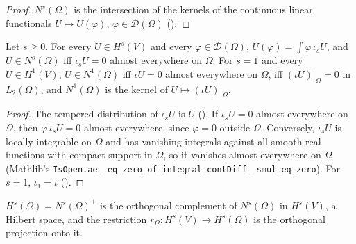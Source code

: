 \begin{proof}
\leanok
$N^s(\Omega)$ is the intersection of the kernels of the continuous linear functionals
$U \mapsto U(\varphi)$, $\varphi \in \mathcal D(\Omega)$ ().
\end{proof}

\begin{proposition}
\label{prop:sobolev-vanishing-one}
\leanok
{}
Let $s \geq 0$. For every $U \in H^s(V)$ and every $\varphi \in \mathcal D(\Omega)$,
$U(\varphi) = \int \varphi \, \iota_s U$, and $U \in N^s(\Omega)$ iff $\iota_s U = 0$ almost
everywhere on $\Omega$. For $s = 1$ and every $U \in H^1(V)$, $U \in N^1(\Omega)$ iff
$\iota U = 0$ almost everywhere on $\Omega$, iff $(\iota U)|_\Omega = 0$ in $L_2(\Omega)$, and
$N^1(\Omega)$ is the kernel of $U \mapsto (\iota U)|_\Omega$.
\end{proposition}

\begin{proof}
\leanok
The tempered distribution of $\iota_s U$ is $U$ (). If $\iota_s U = 0$
almost everywhere on $\Omega$, then $\varphi \, \iota_s U = 0$ almost everywhere, since
$\varphi = 0$ outside $\Omega$. Conversely, $\iota_s U$ is locally integrable on $\Omega$ and has
vanishing integrals against all smooth real functions with compact support in $\Omega$, so it
vanishes almost everywhere on $\Omega$ (Mathlib's \texttt{IsOpen.\allowbreak ae\_\allowbreak
eq\_\allowbreak zero\_\allowbreak of\_\allowbreak integral\_\allowbreak contDiff\_\allowbreak
smul\_\allowbreak eq\_\allowbreak zero}). For $s = 1$, $\iota_1 = \iota$
().
\end{proof}

\begin{definition}
\label{def:sobolev-restriction-space}
\leanok
{}
$H^s(\Omega) = N^s(\Omega)^\perp$ is the orthogonal complement of $N^s(\Omega)$ in $H^s(V)$, a
Hilbert space, and the restriction $r_\Omega : H^s(V) \to H^s(\Omega)$ is the orthogonal
projection onto it.
\end{definition}

